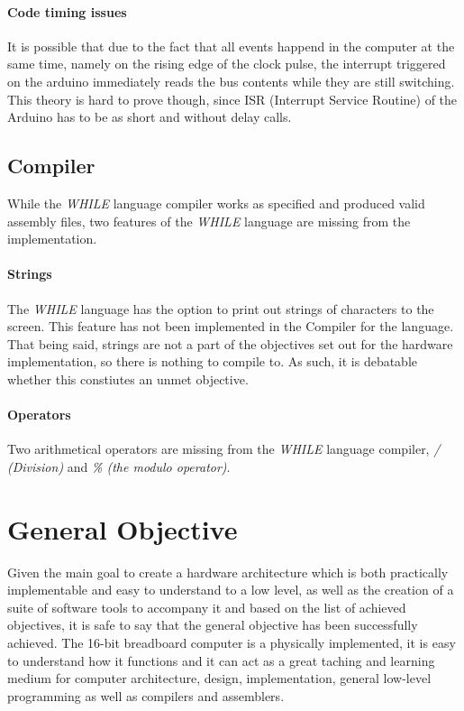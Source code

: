 \paragraph{Code timing issues} It is possible that due to the fact that all events happend in the
computer at the same time, namely on the rising edge of the clock pulse, the interrupt triggered
on the arduino immediately reads the bus contents while they are still switching. This theory
is hard to prove though, since ISR (Interrupt Service Routine) of the Arduino has to be as short and
without delay calls.

\subsection{Compiler}
While the \emph{WHILE} language compiler works as specified and produced valid assembly files,
two features of the \emph{WHILE} language are missing from the implementation.

\paragraph{Strings} The \emph{WHILE} language has the option to print out strings of characters
to the screen. This feature has not been implemented in the Compiler for the language. That being
said, strings are not a part of the objectives set out for the hardware implementation, so there is
nothing to compile to. As such, it is debatable whether this constiutes an unmet objective.

\paragraph{Operators} Two arithmetical operators are missing from the \emph{WHILE} language compiler,
\emph{/ (Division)} and \emph{\% (the modulo operator)}.

\section{General Objective}
Given the main goal to create a hardware architecture which is both practically implementable
and easy to understand to a low level, as well as the creation of a suite of software tools to
accompany it and based on the list of achieved objectives, it is safe to say that the general objective
has been successfully achieved. The 16-bit breadboard computer is a physically implemented, it is
easy to understand how it functions and it can act as a great taching and learning medium for
computer architecture, design, implementation, general low-level programming as well as compilers and
assemblers.
